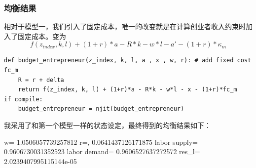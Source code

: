 \documentclass[a4paper, 12pt]{ctexart}
\begin{document}
\subsubsection{均衡结果}
相对于模型一，我们引入了固定成本，唯一的改变就是在计算创业者收入约束时加入了固定成本。变为
$$f(z_{index}, k, l) + (1+r)*a - R*k - w*l - a' - (1+r)*\kappa_m$$
\begin{lstlisting}
def budget_entrepreneur(z_index, k, l, a , x , w, r): # add fixed cost fc_m
    R = r + delta
    return f(z_index, k, l) + (1+r)*a - R*k - w*l - x - (1+r)*fc_m
if compile:
    budget_entrepreneur = njit(budget_entrepreneur)
\end{lstlisting}


我采用了和第一个模型一样的状态设定，最终得到的均衡结果如下：
\begin{figure}[h]
    \centering
    \nonumber
\end{figure}

w= 1.0506057739257812 r=, 0.0641437126171875 labor supply= 0.9606730031352523 labor demand= 0.9606527637272572 res\_l= 2.0239407995115144e-05
\end{document}
